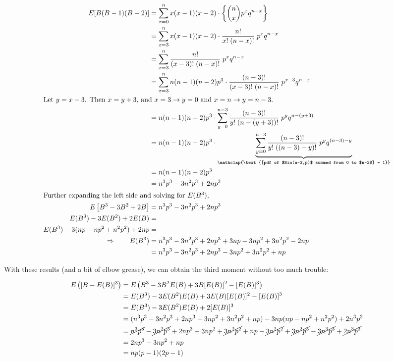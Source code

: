 \documentclass{article}
\begin{document}
\begin{align*}
  E[B(B-1)(B-2)] &= \sum_{x=0}^n x (x-1) (x-2) \cdot \left\{ \binom{n}{x} p^x q^{n-x} \right\} \\
  &= \sum_{x=3}^n x(x-1)(x-2) \cdot \frac{n!}{x!\;(n-x)!} \; p^x q^{n-x} \\
  &= \sum_{x=3}^n \frac{n!}{(x-3)!\;(n-x)!} \; p^x q^{n-x} \\
  &= \sum_{x=3}^n n(n-1)(n-2) p^3 \cdot \frac{(n-3)!}{(x-3)!\;(n-x)!} \; p^{x-3}q^{n-x} \\
  \intertext{Let $y=x-3$. Then $x=y+3$, and $x=3 \rightarrow y=0$ and $x=n \rightarrow y=n-3$.}
  &= n(n-1)(n-2)p^3 \cdot \sum_{y=0}^{n-3} \frac{(n-3)!}{y!\;(n-(y+3))!} \; p^y q^{n-(y+3)} \\
  &= n(n-1)(n-2)p^3 \cdot \underbrace {\sum_{y=0}^{n-3} \frac{(n-3)!}{y!\;((n-3)-y)!} \; p^y q^{(n-3)-y}}_{\mathclap{\text{[pdf of $Bin(n-3,p)$ summed from 0 to $n-3$] = 1}}} \\
  &= n(n-1)(n-2)p^3 \\
  &= n^3p^3 - 3n^2p^3 + 2np^3 \\
  \intertext{Further expanding the left side and solving for $E(B^3)$,}
  E \left[ B^3 - 3B^2 + 2B \right] &= n^3p^3 - 3n^2p^3 + 2np^3 \\
  E(B^3) - 3E(B^2) + 2E(B) &= \\
  E(B^3) - 3(np - np^2 + n^2p^2) + 2np &= \\
  \Rightarrow \qquad E(B^3) &= n^3p^3 - 3n^2p^3 + 2np^3 + 3np - 3np^2 + 3n^2p^2 - 2np \\
  &= n^3p^3 - 3n^2p^3 + 2np^3 - 3np^2 + 3n^2p^2 + np
\end{align*}

With these results (and a bit of elbow grease), we can obtain the third moment
without too much trouble:

\begin{align*}
  E \left( [B - E(B)]^3 \right) &= E \left( B^3 - 3B^2 E(B) + 3B [E(B)]^2 - [E(B)]^3 \right) \\
  &= E(B^3) - 3 E(B^2) E(B) + 3 E(B) [E(B)]^2 - [E(B)]^3 \\
  &= E(B^3) - 3 E(B^2) E(B) + 2 [E(B)]^3 \\
  &= (n^3p^3 - 3n^2p^3 + 2np^3 - 3np^2 + 3n^2p^2 + np) - 3np(np - np^2 + n^2p^2) + 2n^3p^3 \\
  &= \cancel{n^3p^3} - \cancel{3n^2p^3} + 2np^3 - 3np^2 + \cancel{3n^2p^2} + np - \cancel{3n^2p^2} + \cancel{3n^2p^3} - \cancel{3n^3p^3} + \cancel{2n^3p^3} \\
  &= 2np^3 - 3np^2 + np \\
  &= np(p-1)(2p-1)
\end{align*}
\end{document}
